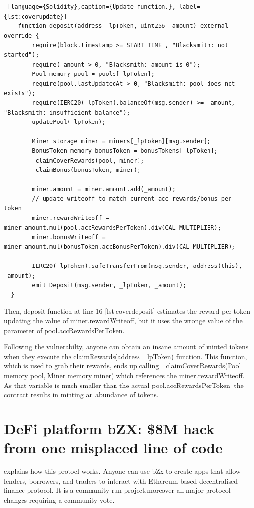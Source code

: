 \begin{lstlisting} [language={Solidity},caption={Update function.}, label={lst:coverupdate}]
    function deposit(address _lpToken, uint256 _amount) external override {
        require(block.timestamp >= START_TIME , "Blacksmith: not started");
        require(_amount > 0, "Blacksmith: amount is 0");
        Pool memory pool = pools[_lpToken];
        require(pool.lastUpdatedAt > 0, "Blacksmith: pool does not exists");
        require(IERC20(_lpToken).balanceOf(msg.sender) >= _amount, "Blacksmith: insufficient balance");
        updatePool(_lpToken);

        Miner storage miner = miners[_lpToken][msg.sender];
        BonusToken memory bonusToken = bonusTokens[_lpToken];
        _claimCoverRewards(pool, miner);
        _claimBonus(bonusToken, miner);

        miner.amount = miner.amount.add(_amount);
        // update writeoff to match current acc rewards/bonus per token
        miner.rewardWriteoff = miner.amount.mul(pool.accRewardsPerToken).div(CAL_MULTIPLIER);
        miner.bonusWriteoff = miner.amount.mul(bonusToken.accBonusPerToken).div(CAL_MULTIPLIER);

        IERC20(_lpToken).safeTransferFrom(msg.sender, address(this), _amount);
        emit Deposit(msg.sender, _lpToken, _amount);
  }
\end{lstlisting}

Then, deposit function at line 16 \autoref{lst:coverdeposit} estimates the reward per token updating the value of miner.rewardWriteoff, 
but it uses the wronge value of the parameter of pool.accRewardsPerToken.

Following the vulnerabilty, anyone can obtain an insane amount of minted tokens when they execute the claimRewards(address \_lpToken) function. 
This function, which is used to grab their rewards, ends up calling \_claimCoverRewards(Pool memory pool, Miner memory miner) which references the miner.rewardWriteoff. 
As that variable is much smaller than the actual pool.accRewardsPerToken, the contract results in minting an abundance of tokens.




\section{DeFi platform bZX: \$8M hack from one misplaced line of code}
\label{sec:Exploits:bZX}

\citet{bZxProtocol} explains how this protocl works. 
Anyone can use bZx to create apps that allow lenders, borrowers, and traders to interact with Ethereum based 
decentralised finance protocol.
It is a community-run project,moreover all major protocol changes requiring a community vote. 

